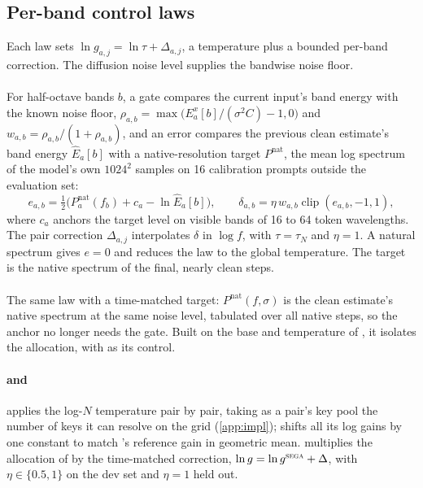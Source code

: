 \subsection{Per-band control laws}\label{app:laws}

Each law sets $\ln g_{a,j}=\ln\tau+\Delta_{a,j}$, a temperature plus a bounded per-band correction. The diffusion noise level supplies the bandwise noise floor.

\paragraph{\constancy}
For half-octave bands $b$, a gate compares the current input's band energy with the known noise floor, $\rho_{a,b}=\max\bigl(E^{x}_{a}[b]/(\sigma^2C)-1,0\bigr)$ and $w_{a,b}=\rho_{a,b}/(1+\rho_{a,b})$, and an error compares the previous clean estimate's band energy $\hat E_a[b]$ with a native-resolution target $P^{\mathrm{nat}}$, the mean log spectrum of the model's own $1024^2$ samples on 16 calibration prompts outside the evaluation set:
\begin{equation}
e_{a,b}=\tfrac12\bigl(P^{\mathrm{nat}}_{a}(f_b)+c_a-\ln \hat E_{a}[b]\bigr),\qquad \delta_{a,b}=\eta\,w_{a,b}\operatorname{clip}(e_{a,b},-1,1),
\label{eq:constancy}
\end{equation}
where $c_a$ anchors the target level on visible bands of 16 to 64 token wavelengths. The pair correction $\Delta_{a,j}$ interpolates $\delta$ in $\log f$, with $\tau=\tau_N$ and $\eta=1$. A natural spectrum gives $e=0$ and reduces the law to the global temperature. The target is the native spectrum of the final, nearly clean steps.

\paragraph{\constancytm}
The same law with a time-matched target: $P^{\mathrm{nat}}(f,\sigma)$ is the clean estimate's native spectrum at the same noise level, tabulated over all  native steps, so the anchor no longer needs the gate. Built on the base and temperature of \segaofficial, it isolates the allocation, with \tempsb{} as its control.

\paragraph{\aliastemp{} and \segactm}
\aliastemp{} applies the log-$N$ temperature pair by pair, taking as a pair's key pool the number of keys it can resolve on the grid (\cref{app:impl}); \aliastemps{} shifts all its log gains by one constant to match \sega's reference gain in geometric mean. \segactm{} multiplies the allocation of \segaofficial{} by the time-matched correction, $\ln g=\ln g^{\textsc{sega}}+\Delta$, with $\eta\in\{0.5,1\}$ on the dev set and $\eta=1$ held out.

